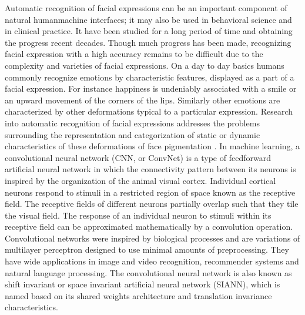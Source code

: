 \documentclass[12pt,a4paper,final]{extreport}
\begin{document}
\vspace{0.5cm}
Automatic recognition of facial expressions can be an important component of  natural  humanmachine  interfaces;  it  may  also  be  used  in behavioral  science  and  in  clinical  practice. It have been studied for a long period of time and obtaining the progress recent decades. Though much progress has been made, recognizing facial expression with a high accuracy remains to be difficult due to the complexity and varieties of facial expressions.
\vspace{0.5cm}
On a day to day basics humans commonly recognize emotions by characteristic features, displayed as a part of a facial expression. For instance happiness is undeniably associated with a smile or an upward movement of the corners of the lips. Similarly other emotions are characterized by other deformations typical to a particular expression. Research into automatic recognition of facial expressions addresses the problems surrounding the representation and categorization of static or dynamic characteristics of these deformations of face pigmentation .    
\vspace{0.5cm}
In machine learning, a convolutional neural network (CNN, or ConvNet) is a type of feedforward artificial neural network in which the connectivity pattern between its neurons is inspired by the organization of the animal visual cortex. Individual cortical neurons respond to stimuli in a restricted region of space known as the receptive field. The receptive fields of different neurons partially overlap such that they tile the visual field. The response of an individual neuron to stimuli within its receptive field can be approximated mathematically by a convolution operation. Convolutional networks were inspired by biological processes and are variations of multilayer perceptron designed to use minimal amounts of preprocessing.
\vspace{0.5cm}
They have wide applications in image and video recognition, recommender systems and natural language processing. The convolutional neural network is also known as shift invariant or space invariant artificial neural network (SIANN), which is named based on its shared weights architecture and translation invariance characteristics. 
\end{document}
